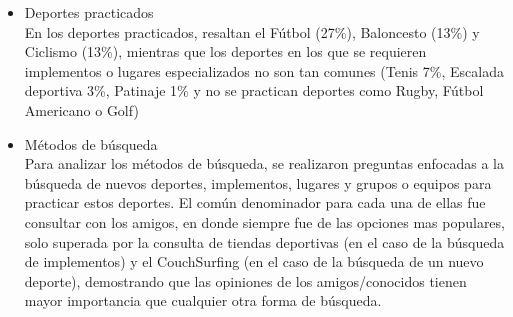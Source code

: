 \begin{itemize}
  \item Deportes practicados \\
  En los deportes practicados, resaltan el Fútbol (27\%), Baloncesto (13\%) y Ciclismo (13\%), mientras que los deportes en los que se requieren implementos o lugares especializados no son tan comunes (Tenis 7\%, Escalada deportiva 3\%, Patinaje 1\% y no se practican deportes como Rugby, Fútbol Americano o Golf)
  \item Métodos de búsqueda \\
  Para analizar los métodos de búsqueda, se realizaron preguntas enfocadas a la búsqueda de nuevos deportes, implementos, lugares y grupos o equipos para practicar estos deportes. El común denominador para cada una de ellas fue consultar con los amigos, en donde siempre fue de las opciones mas populares, solo superada por la consulta de tiendas deportivas (en el caso de la búsqueda de implementos) y el CouchSurfing (en el caso de la búsqueda de un nuevo deporte), demostrando que las opiniones de los amigos/conocidos tienen mayor importancia que cualquier otra forma de búsqueda.
\end{itemize}


